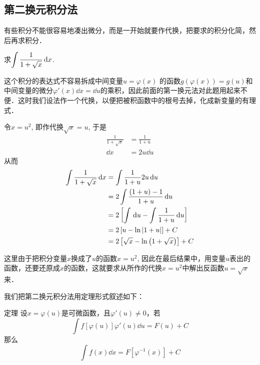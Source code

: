 \subsection{第二换元积分法}

有些积分不能很容易地凑出微分，而是一开始就要作代换，把要求的积分化简，然后再求积分．

\begin{example}
    求$\displaystyle\int \dfrac{1}{1+\sqrt{x}}\,{\rm d} x$.
\end{example}

\begin{solution}
    这个积分的表达式不容易拆成中间变量$u=\varphi(x)$
的函数$g(\varphi(x))=g(u)$和中间变量的微分$\varphi'(x)\dd x=\dd u$的乘积，因此前面的第一换元法对此题用起来不便．这时我们设法作一个代换，以便把被积函数中的根号去掉，化成新变量的有理式．

令$x=u^2$, 即作代换$\sqrt{x}=u$, 于是
\[\begin{split}
    \frac{1}{1+\sqrt{x}}&=\frac{1}{1+u}\\
    \dd x&=2u\dd u
\end{split}\]
从而
\[\begin{split}
    \displaystyle\int \dfrac{1}{1+\sqrt{x}}\,{\rm d} x&=\int \dfrac{1}{1+u}2u\,{\rm d} u\\
    &=2\int \dfrac{(1+u)-1}{1+u}\,{\rm d} u\\
    &=2\left[\int \,{\rm d} u-\int \dfrac{1}{1+u}\,{\rm d} u\right]\\
    &=2\left[u-\ln |1+u|\right]+C\\
    &=2\left[\sqrt{x}-\ln\left(1+\sqrt{x}\right)\right]+C
\end{split}\]
\end{solution}

这里由于把积分变量$x$换成了$u$的函数$x=u^2$, 因此在最后结果中，用变量$u$表出的函数，还要还原成$x$的函数，这就要求从所作的代换$x=u^2$中解出反函数$u=\sqrt{x}$来．

我们把第二换元积分法用定理形式叙述如下：

\begin{blk}{定理}
设$x=\varphi(u)$是可微函数，且$\varphi'(u)\ne 0$，若
\begin{equation}
    \int f[\varphi(u)]\varphi'(u)\dd u=F(u)+C
\end{equation}
那么
\begin{equation}
    \int f(x)\dd x=F\left[\varphi^{-1}(x)\right]+C
\end{equation}
\end{blk}

